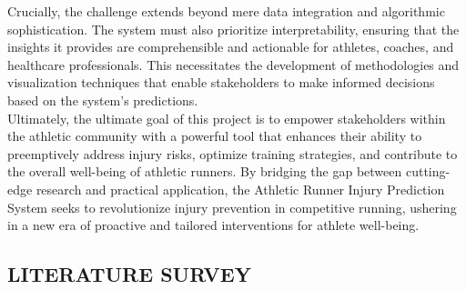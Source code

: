 \documentclass[12pt, English]{article}
\newcommand\tab[1][1cm]{\hspace*{#1}}
\begin{document}
\begin{normalsize}
\begin{normalsize}
\tab Crucially, the challenge extends beyond mere data integration and algorithmic sophistication. The system must also prioritize interpretability, ensuring that the insights it provides are comprehensible and actionable for athletes, coaches, and healthcare professionals. This necessitates the development of methodologies and visualization techniques that enable stakeholders to make informed decisions based on the system's predictions.\\

\tab Ultimately, the ultimate goal of this project is to empower stakeholders within the athletic community with a powerful tool that enhances their ability to preemptively address injury risks, optimize training strategies, and contribute to the overall well-being of athletic runners. By bridging the gap between cutting-edge research and practical application, the Athletic Runner Injury Prediction System seeks to revolutionize injury prevention in competitive running, ushering in a new era of proactive and tailored interventions for athlete well-being.
\end{normalsize}

\newpage
\begin{center}
\section{ \Large LITERATURE SURVEY}
\end{center}


\end{normalsize}
\end{document}
